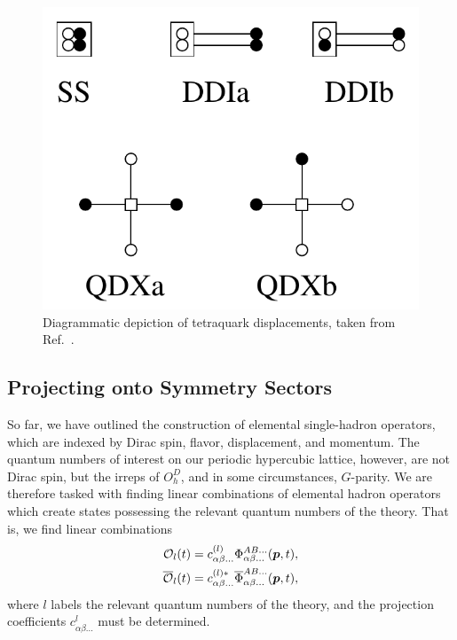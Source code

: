     \begin{figure}
        \centering
        \includegraphics[scale=0.8]{figures/tetraquark_disp.pdf}
        \caption{Diagrammatic depiction of tetraquark displacements, taken from Ref.~\cite{spectroscopy}.}
        \label{fig:tetraquark_disp}
    \end{figure}
    \subsection{Projecting onto Symmetry Sectors}
    So far, we have outlined the construction of elemental single-hadron operators, which are indexed by Dirac spin, flavor, displacement, and momentum. The quantum numbers of interest on our periodic hypercubic lattice, however, are not Dirac spin, but the irreps of $O_h^D$, and in some circumstances, $G$-parity. We are therefore tasked with finding linear combinations of elemental hadron operators which create states possessing the relevant quantum numbers of the theory. That is, we find linear combinations
    \begin{equation}\label{eq:op_proj}
        \begin{aligned}
            \mathcal O_l(t) &= c^{(l)}_{\alpha\beta...}\Phi^{AB...}_{\alpha\beta...}(\boldsymbol{p}, t), \\
            \overline{\mathcal O}_l(t) &= c^{(l)*}_{\alpha\beta...}\overline\Phi^{AB...}_{\alpha\beta...}(\boldsymbol{p}, t),
        \end{aligned}
    \end{equation}
    where $l$ labels the relevant quantum numbers of the theory, and the projection coefficients $c^{l}_{\alpha\beta...}$ must be determined.

